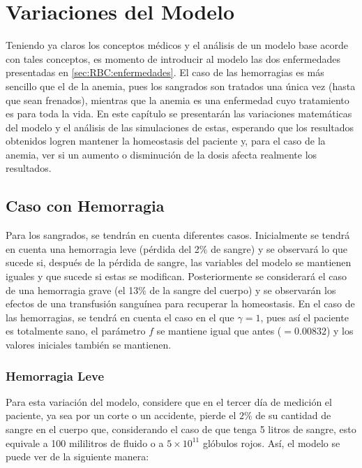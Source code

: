 \chapter{Variaciones del Modelo}\label{chap:variaciones}

Teniendo ya claros los conceptos médicos y el análisis de un modelo base acorde con tales conceptos, es momento de introducir al modelo las dos enfermedades presentadas en \ref{sec:RBC:enfermedades}. El caso de las hemorragias es más sencillo que el de la anemia, pues los sangrados son tratados una única vez (hasta que sean frenados), mientras que la anemia es una enfermedad cuyo tratamiento es para toda la vida. En este capítulo se presentarán las variaciones matemáticas del modelo y el análisis de las simulaciones de estas, esperando que los resultados obtenidos logren mantener la homeostasis del paciente y, para el caso de la anemia, ver si un aumento o disminución de la dosis afecta realmente los resultados.

\section{Caso con Hemorragia}\label{Sec:variaciones:hemorragia}

Para los sangrados, se tendrán en cuenta diferentes casos. Inicialmente se tendrá en cuenta una hemorragia leve (pérdida del 2$\%$ de sangre) y se observará lo que sucede si, después de la pérdida de sangre, las variables del modelo se mantienen iguales y que sucede si estas se modifican. Posteriormente se considerará el caso de una hemorragia grave (el 13$\%$ de la sangre del cuerpo) y se observarán los efectos de una transfusión sanguínea para recuperar la homeostasis. En el caso de las hemorragias, se tendrá en cuenta el caso en el que $\gamma =1$, pues así el paciente es totalmente sano, el parámetro $f$ se mantiene igual que antes ($=0.00832$) y los valores iniciales también se mantienen.

\subsection{Hemorragia Leve}\label{subsec:variaciones:hemorragia:leve}

Para esta variación del modelo, considere que en el tercer día de medición el paciente, ya sea por un corte o un accidente, pierde el $2\%$ de su cantidad de sangre en el cuerpo que, considerando el caso de que tenga 5 litros de sangre, esto equivale a 100 mililitros de fluido o a $5\times 10^{11}$ glóbulos rojos. Así, el modelo se puede ver de la siguiente manera:


